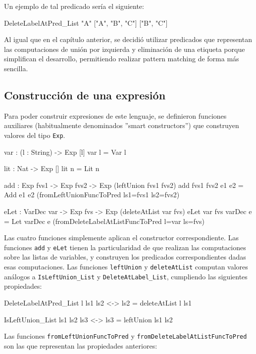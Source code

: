 Un ejemplo de tal predicado sería el siguiente:

\begin{code}
DeleteLabelAtPred_List "A" ["A", "B", "C"]
  ["B", "C"]
\end{code}

Al igual que en el capítulo anterior, se decidió utilizar predicados que representan las computaciones de unión por izquierda y eliminación de una etiqueta porque simplifican el desarrollo, permitiendo realizar pattern matching de forma más sencilla.

\subsection{Construcción de una expresión}

Para poder construir expresiones de este lenguaje, se definieron funciones auxiliares (habitualmente denominados ''smart constructors'') que construyen valores del tipo \texttt{Exp}.

\begin{code}
var : (l : String) -> Exp [l]
var l = Var l

lit : Nat -> Exp []
lit n = Lit n

add : Exp fvs1 -> Exp fvs2 -> Exp (leftUnion fvs1 fvs2)
add {fvs1} {fvs2} e1 e2 = Add e1 e2
  (fromLeftUnionFuncToPred {ls1=fvs1} {ls2=fvs2})

eLet : VarDec var -> Exp fvs -> Exp (deleteAtList var fvs)
eLet {var} {fvs} varDec e = Let varDec e
  (fromDeleteLabelAtListFuncToPred {l=var} {ls=fvs})
\end{code}

Las cuatro funciones simplemente aplican el constructor correspondiente. Las funciones \texttt{add} y \texttt{eLet} tienen la particularidad de que realizan las computaciones sobre las listas de variables, y construyen los predicados correspondientes dadas esas computaciones. Las funciones \texttt{leftUnion} y \texttt{deleteAtList} computan valores análogos a \texttt{IsLeftUnion\_List} y \texttt{DeleteAtLabel\_List}, cumpliendo las siguientes propiedades:

\begin{code}
DeleteLabelAtPred_List l ls1 ls2 <-> ls2 = deleteAtList l ls1

IsLeftUnion_List ls1 ls2 ls3 <-> ls3 = leftUnion ls1 ls2
\end{code}

Las funciones \texttt{fromLeftUnionFuncToPred} y \texttt{fromDeleteLabelAtListFuncToPred} son las que representan las propiedades anteriores:

